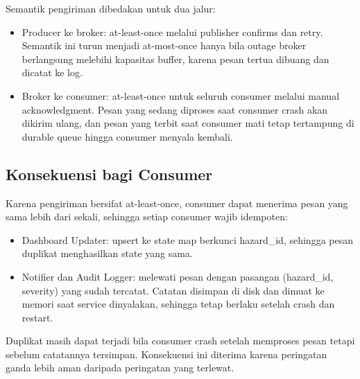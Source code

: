 Semantik pengiriman dibedakan untuk dua jalur:

\begin{itemize}
\tightlist
\item
  Producer ke broker: at-least-once melalui publisher confirms dan retry. Semantik ini turun menjadi at-most-once hanya bila outage broker berlangsung melebihi kapasitas buffer, karena pesan tertua dibuang dan dicatat ke log.\\
\item
  Broker ke consumer: at-least-once untuk seluruh consumer melalui manual acknowledgment. Pesan yang sedang diproses saat consumer crash akan dikirim ulang, dan pesan yang terbit saat consumer mati tetap tertampung di durable queue hingga consumer menyala kembali.
\end{itemize}

\subsection{Konsekuensi bagi Consumer}

Karena pengiriman bersifat at-least-once, consumer dapat menerima pesan yang sama lebih dari sekali, sehingga setiap consumer wajib idempoten:

\begin{itemize}
\tightlist
\item
  Dashboard Updater: upsert ke state map berkunci hazard\_id, sehingga pesan duplikat menghasilkan state yang sama.\\
\item
  Notifier dan Audit Logger: melewati pesan dengan pasangan (hazard\_id, severity) yang sudah tercatat. Catatan disimpan di disk dan dimuat ke memori saat service dinyalakan, sehingga tetap berlaku setelah crash dan restart.
\end{itemize}

Duplikat masih dapat terjadi bila consumer crash setelah memproses pesan tetapi sebelum catatannya tersimpan. Konsekuensi ini diterima karena peringatan ganda lebih aman daripada peringatan yang terlewat.
